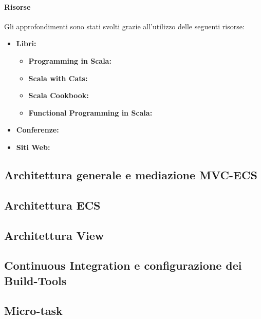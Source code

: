\paragraph{Risorse}
\label{par:risorse}
Gli approfondimenti sono stati svolti grazie all'utilizzo delle seguenti risorse:
\begin{itemize}
	\item{\textbf{Libri:}}
	\begin{itemize}
		\item{\textbf{Programming in Scala:}} \cite[scalaBook:2014]{scalaBook:2014}
		\item{\textbf{Scala with Cats:}} \cite[scalaCats:2014]{scalaCats:2014}
		\item{\textbf{Scala Cookbook:}} \cite[scalaCook:2014]{scalaCook:2014}
		\item{\textbf{Functional Programming in Scala:}} \cite[functionalScala:2014]{functionalScala:2014}
	\end{itemize}
	\item{\textbf{Conferenze:}}
	\item{\textbf{Siti Web:}}
\end{itemize}


\subsection{Architettura generale e mediazione MVC-ECS}
\subsection{Architettura ECS}
\subsection{Architettura View}
\subsection{Continuous Integration e configurazione dei Build-Tools}
\subsection{Micro-task}
